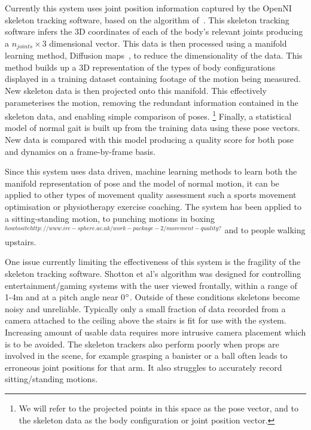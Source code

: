 \documentclass[11pt]{article} %
\begin{document}
Currently this system uses joint position information captured by the OpenNI skeleton tracking software, based on the algorithm of~\cite{Shotton2011}. This skeleton tracking software infers the 3D coordinates of each of the body's relevant joints producing a $n_{joints} \times 3$ dimensional vector. This data is then processed using a manifold learning method, Diffusion maps~\cite{Coifman2006}, to reduce the dimensionality of the data. This method builds up a 3D representation of the types of body configurations displayed in a training dataset containing footage of the motion being measured. New skeleton data is then projected onto this manifold. This effectively parameterises the motion, removing the redundant information contained in the skeleton data, and enabling simple comparison of poses. \footnote{We will refer to the projected points in this space as the pose vector, and to the skeleton data as the body configuration or joint position vector.} Finally, a statistical model of normal gait is built up from the training data using these pose vectors. New data is compared with this model producing a quality score for both pose and dynamics on a frame-by-frame basis.

Since this system uses data driven, machine learning methods to learn both the manifold representation of pose and the model of normal motion, it can be applied to other types of movement quality assessment such a sports movement optimisation or physiotherapy exercise coaching. The system has been applied to a sitting-standing motion, to punching motions in boxing $^{how to site http://www.irc-sphere.ac.uk/work-package-2/movement-quality ?}$ and to people walking upstairs. 

One issue currently limiting the effectiveness of this system is the fragility of the skeleton tracking software. Shotton et al's algorithm was designed for controlling entertainment/gaming systems with the user viewed frontally, within a range of 1-4m and at a pitch angle near 0$\degree$. Outside of these conditions skeletons become noisy and unreliable. Typically only a small fraction of data recorded from a camera attached to the ceiling above the stairs is fit for use with the system. Increasing amount of usable data requires more intrusive camera placement which is to be avoided. The skeleton trackers also perform poorly when props are involved in the scene, for example grasping a banister or a ball often leads to erroneous joint positions for that arm. It also struggles to accurately record sitting/standing motions.
\end{document}
